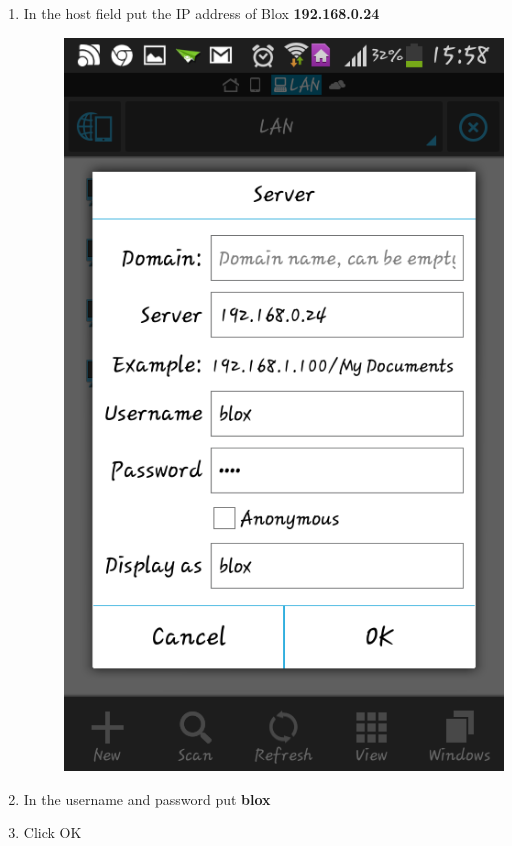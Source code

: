 \documentclass[letterpaper,10pt,english]{sphinxmanual}
\begin{document}
\begin{enumerate}
\item {} \begin{description}
\item[{In the host field put the IP address of Blox \textbf{192.168.0.24}}] \leavevmode
\includegraphics{es.png}

\end{description}

\item {} 
In the username and password put \textbf{blox}

\item {} 
Click OK

\end{enumerate}
\end{document}
